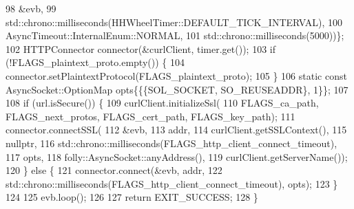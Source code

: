 \begin{DoxyCode}
98       &evb,
99       std::chrono::milliseconds(HHWheelTimer::DEFAULT\_TICK\_INTERVAL),
100       AsyncTimeout::InternalEnum::NORMAL,
101       std::chrono::milliseconds(5000))\};
102   HTTPConnector connector(&curlClient, timer.get());
103   \textcolor{keywordflow}{if} (!FLAGS\_plaintext\_proto.empty()) \{
104     connector.setPlaintextProtocol(FLAGS\_plaintext\_proto);
105   \}
106   \textcolor{keyword}{static} \textcolor{keyword}{const} AsyncSocket::OptionMap opts\{\{\{SOL\_SOCKET, SO\_REUSEADDR\}, 1\}\};
107 
108   \textcolor{keywordflow}{if} (url.isSecure()) \{
109     curlClient.initializeSsl(
110         FLAGS\_ca\_path, FLAGS\_next\_protos, FLAGS\_cert\_path, FLAGS\_key\_path);
111     connector.connectSSL(
112         &evb,
113         addr,
114         curlClient.getSSLContext(),
115         \textcolor{keyword}{nullptr},
116         std::chrono::milliseconds(FLAGS\_http\_client\_connect\_timeout),
117         opts,
118         folly::AsyncSocket::anyAddress(),
119         curlClient.getServerName());
120   \} \textcolor{keywordflow}{else} \{
121     connector.connect(&evb, addr,
122         std::chrono::milliseconds(FLAGS\_http\_client\_connect\_timeout), opts);
123   \}
124 
125   evb.loop();
126 
127   \textcolor{keywordflow}{return} EXIT\_SUCCESS;
128 \}
\end{DoxyCode}
